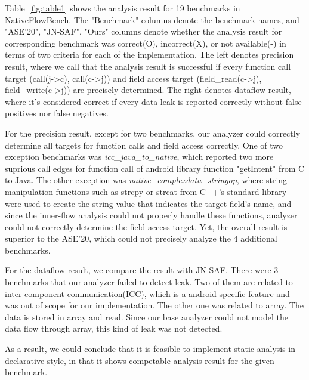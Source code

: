 Table~\ref{fig:table1} shows the analysis result for 19 benchmarks in
NativeFlowBench.  The "Benchmark" columns denote the benchmark names, and
"ASE'20", "JN-SAF", "Ours" columns denote whether the analysis result for
corresponding benchmark was correct(O), incorrect(X), or not available(-) in
terms of two criteria for each of the implementation.  The left denotes
precision result, where we call that the analysis result is successful if every
function call target (call(j->c), call(c->j)) and field access target
(field\_read(c->j), field\_write(c->j)) are precisely determined. The right
denotes dataflow result, where it's considered correct if every data leak is
reported correctly without false positives nor false negatives. 

For the precision result, except for two benchmarks, our analyzer could
correctly determine all targets for function calls and field access correctly.
One of two exception benchmarks was \textit{icc\_java\_to\_native}, which
reported two more suprious call edges for function call of android library
function "getIntent" from C to Java. The other exception was
\textit{native\_complexdata\_stringop}, where string manipulation functions
such as strcpy or strcat from C++'s standard library were used to create the
string value that indicates the target field's name, and since the inner-flow
analysis could not properly handle these functions, analyzer could not
correctly determine the field access target. Yet, the overall result is
superior to the ASE'20, which could not precisely analyze the 4 additional
benchmarks.

For the dataflow result, we compare the result with JN-SAF. There were 3 benchmarks
that our analyzer failed to detect leak. Two of them are related to inter component
communication(ICC), which is a android-specific feature and was out of scope for
our implementation. The other one was related to array. The data is stored in
array and read. Since our base analyzer could not model the data flow through
array, this kind of leak was not detected.

As a result, we could conclude that it is feasible to implement
static analysis in declarative style, in that it shows competable
analysis result for the given benchmark.


